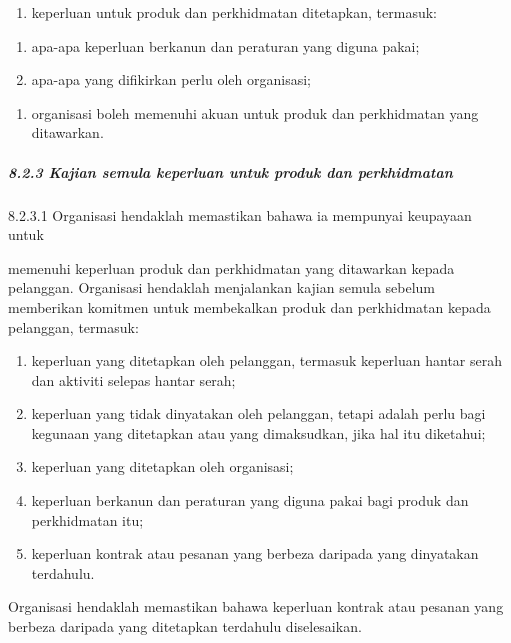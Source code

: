 \documentclass[
]{article}
\providecommand{\tightlist}{%
  \setlength{\itemsep}{0pt}\setlength{\parskip}{0pt}}
\begin{document}
\begin{enumerate}
\def\labelenumi{\alph{enumi})}
\tightlist
\item
  keperluan untuk produk dan perkhidmatan ditetapkan, termasuk:
\end{enumerate}

\begin{enumerate}
\def\labelenumi{\arabic{enumi})}
\item
  apa-apa keperluan berkanun dan peraturan yang diguna pakai;
\item
  apa-apa yang difikirkan perlu oleh organisasi;
\end{enumerate}

\begin{enumerate}
\def\labelenumi{\alph{enumi})}
\setcounter{enumi}{1}
\tightlist
\item
  organisasi boleh memenuhi akuan untuk produk dan perkhidmatan yang
  ditawarkan.
\end{enumerate}

\hypertarget{kajian-semula-keperluan-untuk-produk-dan-perkhidmatan}{%
\subparagraph{8.2.3 Kajian semula keperluan untuk produk dan
perkhidmatan}\label{kajian-semula-keperluan-untuk-produk-dan-perkhidmatan}}

8.2.3.1 Organisasi hendaklah memastikan bahawa ia mempunyai keupayaan
untuk

memenuhi keperluan produk dan perkhidmatan yang ditawarkan kepada
pelanggan. Organisasi hendaklah menjalankan kajian semula sebelum
memberikan komitmen untuk membekalkan produk dan perkhidmatan kepada
pelanggan, termasuk:

\begin{enumerate}
\def\labelenumi{\alph{enumi})}
\item
  keperluan yang ditetapkan oleh pelanggan, termasuk keperluan hantar
  serah dan aktiviti selepas hantar serah;
\item
  keperluan yang tidak dinyatakan oleh pelanggan, tetapi adalah perlu
  bagi kegunaan yang ditetapkan atau yang dimaksudkan, jika hal itu
  diketahui;
\item
  keperluan yang ditetapkan oleh organisasi;
\item
  keperluan berkanun dan peraturan yang diguna pakai bagi produk dan
  perkhidmatan itu;
\item
  keperluan kontrak atau pesanan yang berbeza daripada yang dinyatakan
  terdahulu.
\end{enumerate}

Organisasi hendaklah memastikan bahawa keperluan kontrak atau pesanan
yang berbeza daripada yang ditetapkan terdahulu diselesaikan.
\end{document}
